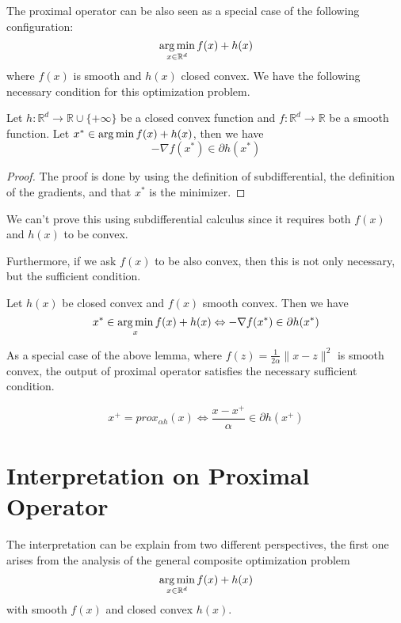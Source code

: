 The proximal operator can be also seen as a special case of the following configuration:
\begin{equation*}
    \operatorname*{arg\,min}_{x \in \mathbb{R}^d} f(x) + h(x)
\end{equation*}
where $f(x)$ is smooth and $h(x)$ closed convex. We have the following necessary condition for this optimization problem. 
\begin{lemma}\label{lemma:CompositeMinNecessary}
    Let $h : \mathbb{R}^d \rightarrow \mathbb{R}\cup\{+\infty\}$ be a closed convex function and $f : \mathbb{R}^d \rightarrow \mathbb{R}$ be a smooth function. Let $x^* \in \operatorname*{arg\,min} f(x) + h(x)$, then we have
    \begin{equation*}
        - \nabla f(x^*) \in \partial h(x^*)
    \end{equation*}
\end{lemma}
\begin{proof}
    The proof is done by using the definition of subdifferential, the definition of the gradients, and that $x^*$ is the minimizer. 
\end{proof}
\begin{note}
    We can't prove this using subdifferential calculus since it requires both $f(x)$ and $h(x)$ to be convex. 
\end{note}

Furthermore, if we ask $f(x)$ to be also convex, then this is not only necessary, but the sufficient condition. 
\begin{lemma}
    Let $h(x)$ be closed convex and $f(x)$ smooth convex. Then we have
    \begin{equation*}
        x^* \in \operatorname*{arg\,min}_x f(x) + h(x) \Leftrightarrow -\nabla f(x^*) \in \partial h(x^*)
    \end{equation*}
\end{lemma}

As a special case of the above lemma, where $f(z) = \frac{1}{2\alpha}\|x-z\|^2$ is smooth convex, the output of proximal operator satisfies the necessary sufficient condition.
\begin{corollary}\label{corollary:ProximalOperatorNecessarySufficient}
    \begin{equation*}
        x^+ = prox_{\alpha h}(x) \iff \frac{x - x^+}{\alpha} \in \partial h(x^+)
    \end{equation*}
\end{corollary}


\section{Interpretation on Proximal Operator}
The interpretation can be explain from two different perspectives, the first one arises from the analysis of the general composite optimization problem
\begin{equation*}
    \operatorname*{arg\,min}_{x \in \mathbb{R}^d} f(x) + h(x)
\end{equation*}
with smooth $f(x)$ and closed convex $h(x)$. 
